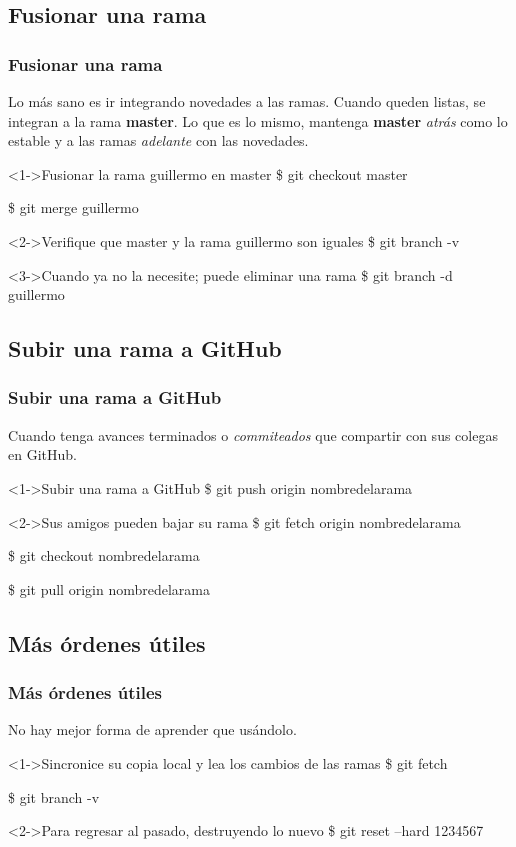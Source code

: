 \subsection{Fusionar una rama}
\begin{frame}
  \frametitle{Fusionar una rama}
  Lo más sano es ir integrando novedades a las ramas. Cuando queden listas, se integran a la rama \textbf{master}.
  Lo que es lo mismo, mantenga \textbf{master} \textit{atrás} como lo estable y a las ramas \textit{adelante} con las novedades.
  \begin{block}<1->{Fusionar la rama guillermo en master}
    \$ git checkout master\par
    \$ git merge guillermo
  \end{block}
  \begin{block}<2->{Verifique que master y la rama guillermo son iguales}
    \$ git branch -v
  \end{block}
  \begin{block}<3->{Cuando ya no la necesite; puede eliminar una rama}
    \$ git branch -d guillermo
  \end{block}
\end{frame}

\subsection{Subir una rama a GitHub}
\begin{frame}
  \frametitle{Subir una rama a GitHub}
  Cuando tenga avances terminados o \textit{commiteados} que compartir con sus colegas en GitHub.
  \begin{block}<1->{Subir una rama a GitHub}
    \$ git push origin nombredelarama
  \end{block}
  \begin{block}<2->{Sus amigos pueden bajar su rama}
    \$ git fetch origin nombredelarama\par
    \$ git checkout nombredelarama\par
    \$ git pull origin nombredelarama
  \end{block}
\end{frame}

\subsection{Más órdenes útiles}
\begin{frame}
  \frametitle{Más órdenes útiles}
  No hay mejor forma de aprender que usándolo.
  \begin{block}<1->{Sincronice su copia local y lea los cambios de las ramas}
    \$ git fetch\par
    \$ git branch -v
  \end{block}
  \begin{block}<2->{Para regresar al pasado, destruyendo lo nuevo}
    \$ git reset --hard 1234567
  \end{block}
\end{frame}
